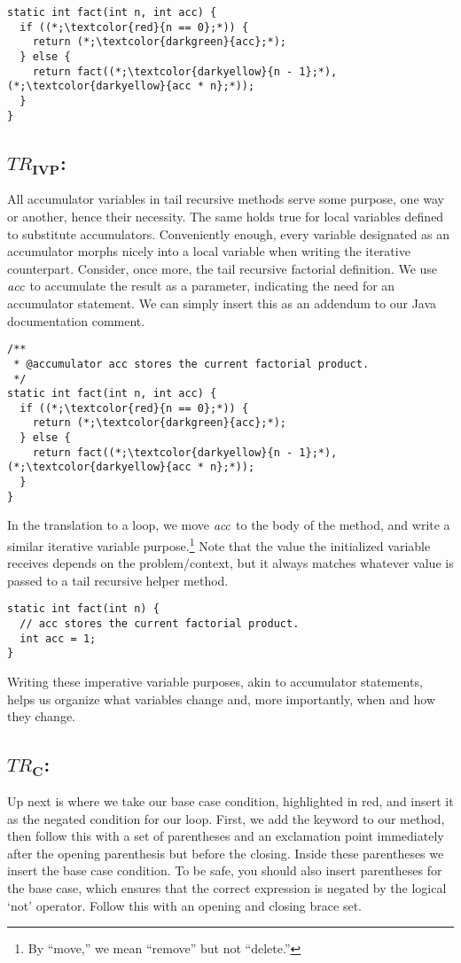 \begin{lstlisting}[language=MyJava]
static int fact(int n, int acc) {
  if ((*;\textcolor{red}{n == 0};*)) {
    return (*;\textcolor{darkgreen}{acc};*);
  } else {
    return fact((*;\textcolor{darkyellow}{n - 1};*), (*;\textcolor{darkyellow}{acc * n};*));
  }
}
\end{lstlisting}

\subsection{\emph{$TR_\mathbf{IVP}$}:} All accumulator variables in tail recursive methods serve some purpose, one way or another, hence their necessity. The same holds true for local variables defined to substitute accumulators. Conveniently enough, every variable designated as an accumulator morphs nicely into a local variable when writing the iterative counterpart. Consider, once more, the tail recursive factorial definition. We use $\emph{acc}$ to accumulate the result as a parameter, indicating the need for an accumulator statement. We can simply insert this as an addendum to our Java documentation comment.

\begin{lstlisting}[language=MyJava]
/**
 * @accumulator acc stores the current factorial product. 
 */
static int fact(int n, int acc) {
  if ((*;\textcolor{red}{n == 0};*)) {
    return (*;\textcolor{darkgreen}{acc};*);
  } else {
    return fact((*;\textcolor{darkyellow}{n - 1};*), (*;\textcolor{darkyellow}{acc * n};*));
  }
}
\end{lstlisting}

In the translation to a loop, we move $\emph{acc}$ to the body of the method, and write a similar iterative variable purpose.\footnote{By ``move,'' we mean ``remove'' but not ``delete.''} Note that the value the initialized variable receives depends on the problem/context, but it always matches whatever value is passed to a tail recursive helper method.

\begin{lstlisting}[language=MyJava]
static int fact(int n) {
  // acc stores the current factorial product. 
  int acc = 1;
}
\end{lstlisting}

Writing these imperative variable purposes, akin to accumulator statements, helps us organize what variables change and, more importantly, when and how they change. 

\subsection{\emph{$TR_\mathbf{C}$}:} Up next is where we take our base case condition, highlighted in red, and insert it as the negated condition for our loop. First, we add the  keyword to our method, then follow this with a set of parentheses and an exclamation point immediately after the opening parenthesis but before the closing. Inside these parentheses we insert the base case condition. To be safe, you should also insert parentheses for the base case, which ensures that the correct expression is negated by the logical `not' operator. Follow this with an opening and closing brace set.

